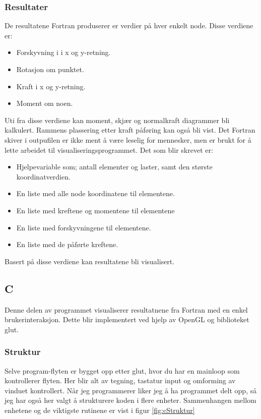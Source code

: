 \documentclass[10pt,a4paper, norsk]{article}
\begin{document}
\subsubsection{Resultater}
De resultatene Fortran produserer er verdier på hver enkelt node. Disse verdiene er:

\begin{itemize}
\item Forskyvning i i x og y-retning.
\item Rotasjon om punktet.
\item Kraft i x og y-retning.
\item Moment om noen. 
\end{itemize}

Uti fra disse verdiene kan moment, skjær og normalkraft diagrammer bli kalkulert. Rammens plassering etter kraft påføring kan også bli vist. Det Fortran skiver i outpufilen er ikke ment å være leselig for mennesker, men er brukt for å lette arbeidet til visualiseringsprogrammet. Det som blir skrevet er:


\begin{itemize}
\item Hjelpevariable som; antall elementer og laster, samt den største koordinatverdien.
\item En liste med alle node koordinatene til elementene.
\item En liste med kreftene og momentene til elementene
\item En liste med forskyvningene til elementene.
\item En liste med de påførte kreftene.
\end{itemize}

Basert på disse  verdiene kan resultatene bli visualisert.


\subsection{C}
Denne delen av programmet visualiserer resultatnene fra Fortran med en enkel brukerinteraksjon. Dette blir implementert ved hjelp av OpenGL og biblioteket glut. 

\subsubsection{Struktur}
Selve program-flyten er bygget opp etter glut, hvor du har en mainloop som kontrollerer flyten. Her blir alt av tegning, tastatur input og omforming av vinduet kontrollert. Når jeg programmerer liker jeg å ha programmet delt opp, så jeg har også her valgt å strukturere koden i flere enheter. 
Sammenhangen mellom enhetene og de viktigste rutinene er vist i 
 figur \ref{fig:cStruktur}
\end{document}
